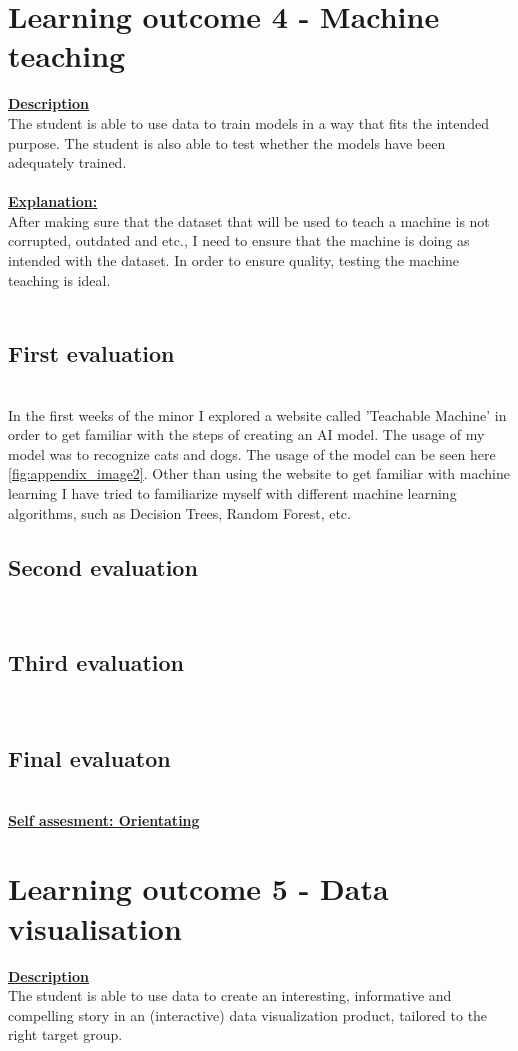 \documentclass{article}
\begin{document}
\section{Learning outcome 4 - Machine teaching}
\underline{\textbf{Description}}\\
The student is able to use data to train models in a way that fits the intended purpose.
The student is also able to test whether the models have been adequately trained.\\\\
\underline{\textbf{Explanation:}}\\
After making sure that the dataset that will be used to teach a machine is not corrupted, outdated and etc., 
I need to ensure that the machine is doing as intended with the dataset. In order to ensure quality, testing the
machine teaching is ideal.\\\\
\subsection{First evaluation}\\
In the first weeks of the minor I explored a website called 'Teachable Machine' in order to get familiar with the steps of creating an 
AI model. The usage of my model was to recognize cats and dogs. The usage of the model can be seen here \ref{fig:appendix_image2}. Other than using the website 
to get familiar with machine learning I have tried to familiarize myself with different machine learning algorithms, such as Decision Trees, Random Forest, etc.
\subsection{Second evaluation}\\
\subsection{Third evaluation}\\
\subsection{Final evaluaton}\\
\underline{\textbf{Self assesment: Orientating}}
\section{Learning outcome 5 - Data visualisation}
\underline{\textbf{Description}}\\
The student is able to use data to create an interesting, informative and 
compelling story in an (interactive) data visualization product, tailored to the right target group.\\\\ 
\end{document}
